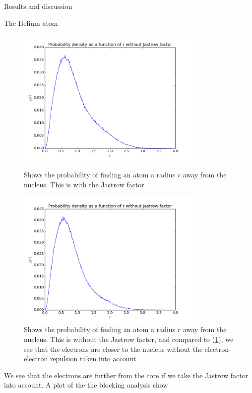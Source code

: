 \documentclass[a4paper, 12pt, titlepage]{article}
\begin{document}
\begin{section}{Results and discussion}
\begin{subsection}{The Helium atom}
	\begin{figure}[H]
 	\centering
 	\includegraphics[width=0.8\textwidth]{../../Project3_Gaussian/python_scripts/ProbabilityDensityHelium_Jastrow.png}
 	\label{fig1}
 	\caption{Shows the probability of finding an atom a radius $r$ away from the nucleus. This is with the Jastrow factor}
 	\end{figure}
 	\begin{figure}[H]
 	\centering
 	\includegraphics[width=0.8\textwidth]{../../Project3_Gaussian/python_scripts/ProbabilityDensityHelium_noJastrow.png}
 	\caption{Shows the probability of finding an atom a radius $r$ away from the nucleus. This is without the Jastrow factor, and compared to (\ref{fig1}), we see that the electrons are closer to the nucleus without the electron-electron repulsion taken into account.}
 	\end{figure}
 	We see that the electrons are further from the core if we take the Jastrow factor into account. A plot of the the blocking analysis show
 	\begin{figure}[H]

\end{figure}
\end{subsection}
\end{section}
\end{document}
